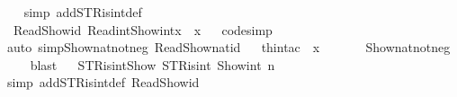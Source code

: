 \begin{isabellebody}
%
\isadelimproof
\ \ %
\endisadelimproof
%
\isatagproof
{}\isamarkupfalse%
{\isacharparenleft}{\kern0pt}simp\ add{\isacharcolon}{\kern0pt}STR{\isacharunderscore}{\kern0pt}is{\isacharunderscore}{\kern0pt}int{\isacharunderscore}{\kern0pt}def{\isacharparenright}{\kern0pt}%
\endisatagproof
{\isafoldproof}%
%
\isadelimproof
\isanewline
%
\endisadelimproof
\ \ \ \ \ \ \ \ \ \ \ \ \ \ \ \ \ \ \ \ \ \ \ \ \ \ \isanewline
{}\isamarkupfalse%
\ Read{\isacharunderscore}{\kern0pt}Show{\isacharunderscore}{\kern0pt}id{\isacharcolon}{\kern0pt}\ {\isacartoucheopen}Read\isactrlsub i\isactrlsub n\isactrlsub t{\isacharparenleft}{\kern0pt}Show\isactrlsub i\isactrlsub n\isactrlsub t{\isacharparenleft}{\kern0pt}x{\isacharparenright}{\kern0pt}{\isacharparenright}{\kern0pt}\ {\isacharequal}{\kern0pt}\ x{\isacartoucheclose}\isanewline
%
\isadelimproof
\ \ %
\endisadelimproof
%
\isatagproof
{}\isamarkupfalse%
{\isacharparenleft}{\kern0pt}code{\isacharunderscore}{\kern0pt}simp{\isacharparenright}{\kern0pt}\isanewline
\ \ \isamarkupfalse%
{\isacharparenleft}{\kern0pt}auto\ simp{\isacharcolon}{\kern0pt}Show{\isacharunderscore}{\kern0pt}nat{\isacharunderscore}{\kern0pt}not{\isacharunderscore}{\kern0pt}neg\ Read{\isacharunderscore}{\kern0pt}Show{\isacharunderscore}{\kern0pt}nat{\isacharunderscore}{\kern0pt}id{\isacharparenright}{\kern0pt}{\isacharbrackleft}{\kern0pt}{}{\isacharbrackright}{\kern0pt}\isanewline
\ \ \isamarkupfalse%
{\isacharparenleft}{\kern0pt}thin{\isacharunderscore}{\kern0pt}tac\ {\isacartoucheopen}{\isasymnot}\ x\ {\isacharless}{\kern0pt}\ {}\ {\isacartoucheclose}{\isacharparenright}{\kern0pt}\isanewline
\ \ \isamarkupfalse%
\ Show{\isacharunderscore}{\kern0pt}nat{\isacharunderscore}{\kern0pt}not{\isacharunderscore}{\kern0pt}neg{\isacharprime}{\kern0pt}{\isacharprime}{\kern0pt}\isanewline
\ \ \isamarkupfalse%
\ blast%
\endisatagproof
{\isafoldproof}%
%
\isadelimproof
\ \isanewline
%
\endisadelimproof
\isanewline
{}\isamarkupfalse%
\ STR{\isacharunderscore}{\kern0pt}is{\isacharunderscore}{\kern0pt}int{\isacharunderscore}{\kern0pt}Show{\isacharcolon}{\kern0pt}\ {\isacartoucheopen}STR{\isacharunderscore}{\kern0pt}is{\isacharunderscore}{\kern0pt}int\ {\isacharparenleft}{\kern0pt}Show\isactrlsub i\isactrlsub n\isactrlsub t\ n{\isacharparenright}{\kern0pt}{\isacartoucheclose}\isanewline
%
\isadelimproof
\ \ %
\endisadelimproof
%
\isatagproof
{}\isamarkupfalse%
{\isacharparenleft}{\kern0pt}simp\ add{\isacharcolon}{\kern0pt}STR{\isacharunderscore}{\kern0pt}is{\isacharunderscore}{\kern0pt}int{\isacharunderscore}{\kern0pt}def\ Read{\isacharunderscore}{\kern0pt}Show{\isacharunderscore}{\kern0pt}id{\isacharparenright}{\kern0pt}%

\end{isabellebody}
